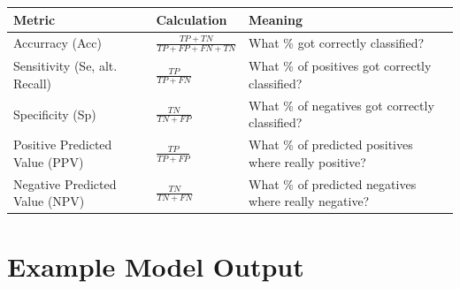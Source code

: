 \renewcommand{\arraystretch}{1.5}
\begin{table}[h!]
    \centering
    \begin{tabular}{p{3cm} p{3cm} p{4cm}}
        Metric & Calculation & Meaning \\
        \hline
        Accurracy \newline (Acc) & $\frac{TP+TN}{TP+FP+FN+TN}$ & What \% got \newline correctly classified? \\
        Sensitivity \newline (Se, alt. Recall) & $\frac{TP}{TP+FN}$ & What \% of positives \newline got correctly \newline classified? \\
        Specificity \newline (Sp) & $\frac{TN}{TN+FP}$ & What \% of negatives \newline got correctly \newline classified? \\
        Positive Predicted \newline Value (PPV) & $\frac{TP}{TP+FP}$ & What \% of predicted \newline positives where \newline really positive? \\
        Negative Predicted \newline Value (NPV) & $\frac{TN}{TN+FN}$ & What \% of predicted \newline negatives where \newline really negative? \\
    \end{tabular}
\end{table}

\newpage
\section{Example Model Output\label{Apx-Output}}

